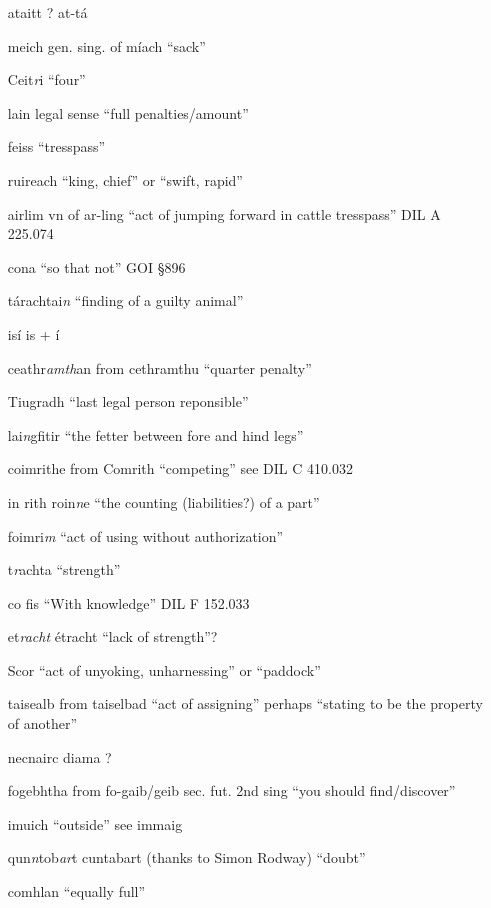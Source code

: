 \documentclass[11pt]{article}
\begin{document}
\begin{enumerate}
  \item[ataitt] ? at-t\'{a}
  \item[meich] gen. sing. of m\'{i}ach \enquote{sack}
  \item[Ceit\emph{r}i] \enquote{four}
  \item[lain] legal sense \enquote{full penalties/amount}
  \item[feiss] \enquote{tresspass}
  \item[ruireach] \enquote{king, chief} or \enquote{swift, rapid}
  \item[airlim] vn of ar-ling \enquote{act of jumping forward in cattle tresspass} DIL A 225.074
  \item[cona] \enquote{so that not} GOI \S 896
  \item[t\'{a}rachtai\emph{n}] \enquote{finding of a guilty animal}
  \item[is\'{i}] is + \'{i}
  \item[ceathr\emph{amth}an] from cethramthu \enquote{quarter penalty}
  \item[Tiugradh] \enquote{last legal person reponsible}
  \item[lai\emph{n}gfitir] \enquote{the fetter between fore and hind legs}
  \item[coimrithe] from Comrith \enquote{competing} see DIL C 410.032
  \item[in rith roin\emph{n}e] \enquote{the counting (liabilities?) of a part}
  \item[foimri\emph{m}] \enquote{act of using without authorization}
  \item[t\emph{r}achta] \enquote{strength}
  \item[co fis] \enquote{With knowledge} DIL F 152.033
  \item[et\emph{racht}] \'{e}tracht \enquote{lack of strength}?
  \item[Scor] \enquote{act of unyoking, unharnessing} or \enquote{paddock}
  \item[taisealb] from taiselbad \enquote{act of assigning} perhaps \enquote{stating to be the property of another}
  \item[necnairc diama] ?
  \item[fogebhtha] from fo-gaib/geib sec. fut. 2nd sing \enquote{you should find/discover}
  \item[imuich] \enquote{outside} see immaig
  \item[qun\emph{n}tob\emph{ar}t] cuntabart (thanks to Simon Rodway) \enquote{doubt}
  \item[comhlan] \enquote{equally full}

\end{enumerate}
\end{document}
